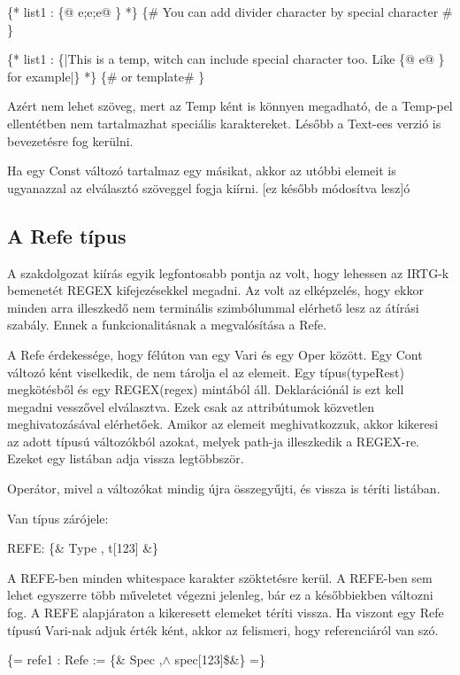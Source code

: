 \{* list1 : \{@ e;e;e@ \} *\} \{\# You can add divider character by special character \#  \}

\{* list1 : \{|This is a temp, witch can include special character too. Like \{@ e@ \} for example|\} *\} \{\# or template\# \}

Azért nem lehet szöveg, mert az Temp ként is könnyen megadható, de a Temp-pel ellentétben nem tartalmazhat speciális karaktereket.
Lésőbb a Text-ees verzió is bevezetésre fog kerülni.

Ha egy Const változó tartalmaz egy másikat, akkor az utóbbi elemeit is ugyanazzal az elválasztó szöveggel fogja kiírni. 
[ez később módosítva lesz]ó

\subsection{A Refe típus}

A szakdolgozat kiírás egyik legfontosabb pontja az volt, hogy lehessen az IRTG-k bemenetét REGEX kifejezésekkel megadni.
Az volt az elképzelés, hogy ekkor minden arra illeszkedő nem terminális szimbólummal elérhető lesz az átírási szabály.
Ennek a funkcionalitásnak a megvalósítása a Refe.

A Refe érdekessége, hogy félúton van egy Vari és egy Oper között.
Egy Cont változó ként viselkedik, de nem tárolja el az elemeit.
Egy típus(typeRest) megkötésből és egy REGEX(regex) mintából áll.
Deklarációnál is ezt kell megadni vesszővel elválasztva.
Ezek csak az attribútumok közvetlen meghivatozásával elérhetőek.
Amikor az elemeit meghivatkozzuk, akkor kikeresi az adott típusú változókból azokat,
melyek path-ja illeszkedik a REGEX-re.
Ezeket egy listában adja vissza legtöbbször.

Operátor, mivel a változókat mindig újra összegyűjti, és vissza is téríti listában.

Van típus zárójele:

REFE: \{\& Type , t[123] \&\}

A REFE-ben minden whitespace karakter szöktetésre kerül.
A REFE-ben sem lehet egyszerre több műveletet végezni jelenleg, bár ez a későbbiekben változni fog.
A REFE alapjáraton a kikeresett elemeket téríti vissza.
Ha viszont egy Refe típusú Vari-nak adjuk érték ként, akkor az felismeri, hogy referenciáról van szó.

\{= refe1 : Refe := \{\& Spec ,$\land$ spec[123]\$\&\} =\}

